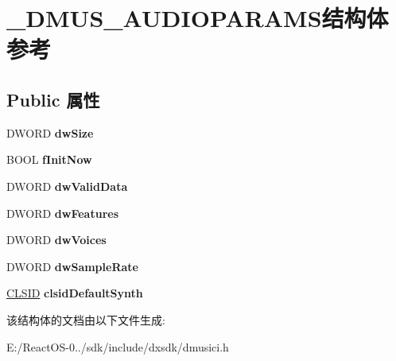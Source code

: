 \hypertarget{struct___d_m_u_s___a_u_d_i_o_p_a_r_a_m_s}{}\section{\+\_\+\+D\+M\+U\+S\+\_\+\+A\+U\+D\+I\+O\+P\+A\+R\+A\+M\+S结构体 参考}
\label{struct___d_m_u_s___a_u_d_i_o_p_a_r_a_m_s}
\subsection*{Public 属性}
\begin{DoxyCompactItemize}
\item 
\mbox{\label{struct___d_m_u_s___a_u_d_i_o_p_a_r_a_m_s_a17f7c7e013f1e436091e09ff7075b632}} 
D\+W\+O\+RD {\bfseries dw\+Size}
\item 
\mbox{\label{struct___d_m_u_s___a_u_d_i_o_p_a_r_a_m_s_a02fa51e5d884da64182a97cb02200d74}} 
B\+O\+OL {\bfseries f\+Init\+Now}
\item 
\mbox{\label{struct___d_m_u_s___a_u_d_i_o_p_a_r_a_m_s_aaa5a3fbe484a36d0354346587f1d3dad}} 
D\+W\+O\+RD {\bfseries dw\+Valid\+Data}
\item 
\mbox{\label{struct___d_m_u_s___a_u_d_i_o_p_a_r_a_m_s_a00177618e20dd3722dbdeb969bc98a32}} 
D\+W\+O\+RD {\bfseries dw\+Features}
\item 
\mbox{\label{struct___d_m_u_s___a_u_d_i_o_p_a_r_a_m_s_ae2cf7dca372df2236ec49c57b74bdcfd}} 
D\+W\+O\+RD {\bfseries dw\+Voices}
\item 
\mbox{\label{struct___d_m_u_s___a_u_d_i_o_p_a_r_a_m_s_a7233e7ba5dd52d92d1a9b1250f04fc41}} 
D\+W\+O\+RD {\bfseries dw\+Sample\+Rate}
\item 
\mbox{\label{struct___d_m_u_s___a_u_d_i_o_p_a_r_a_m_s_a903bf5976ac5a21248e73a98a68b4ecc}} 
\hyperlink{struct___i_i_d}{C\+L\+S\+ID} {\bfseries clsid\+Default\+Synth}
\end{DoxyCompactItemize}


该结构体的文档由以下文件生成\+:\begin{DoxyCompactItemize}
\item 
E\+:/\+React\+O\+S-\/0../sdk/include/dxsdk/dmusici.\+h\end{DoxyCompactItemize}
